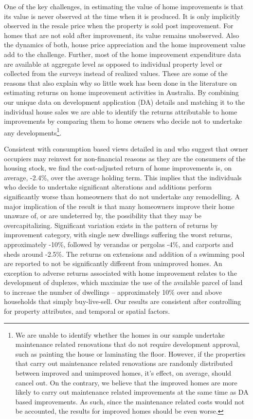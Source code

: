 \documentclass[AEJ,reqno, draftmode]{AEA} %
\begin{document}
One of the key challenges, in estimating the value of home improvements is that its value is never observed at the time when it is produced. It is only implicitly observed in the resale price when the property is sold post improvement. For homes that are not sold after improvement, its value remains unobserved. Also the dynamics of both, house price appreciation and the home improvement value add to the challenge. Further, most of the home improvement expenditure data are available at aggregate level as opposed to individual property level or collected from the surveys instead of realized values. These are some of the reasons that also explain why so little work has been done in the literature on estimating returns on home improvement activities in Australia. By combining our unique data on development application (DA) details and matching it to the individual house sales we are able to identify the returns attributable to home improvements by comparing them to home owners who decide not to undertake any developments\footnote{We are unable to identify whether the homes in our sample undertake maintenance related renovations that do not require development approval, such as painting the house or laminating the floor. However, if the properties that carry out maintenance related renovations are randomly distributed between improved and unimproved homes, it's effect, on average, should cancel out. On the contrary, we believe that the improved homes are more likely to carry out maintenance related improvements at the same time as DA based improvements. As such, since the maintenance related costs would not be accounted, the results for improved homes should be even worse.}.

Consistent with consumption based views detailed in \citet{choi2014speculating} and \citet{gyourko2004reinvestment} who suggest that owner occupiers may reinvest for non-financial reasons as they are the consumers of the housing stock, we find the cost-adjusted return of home improvements is, on average, -2.4\%, over the average holding term. This implies that the individuals who decide to undertake significant alterations and additions perform significantly worse than homeowners that do not undertake any remodelling. A major implication of the result is that many homeowners improve their home unaware of, or are undeterred by, the possibility that they may be overcapitalizing. Significant variation exists in the pattern of returns by improvement category, with single new dwellings suffering the worst returns, approximately -10\%, followed by verandas or pergolas -4\%, and carports and sheds around -2.5\%. The returns on extensions and addition of a swimming pool are reported to not be significantly different from unimproved homes. An exception to adverse returns associated with home improvement relates to the development of duplexes, which maximize the use of the available parcel of land to increase the number of dwellings -- approximately 10\% over and above households that simply buy-live-sell. Our results are consistent after controlling for property attributes, and temporal or spatial factors.
\end{document}
